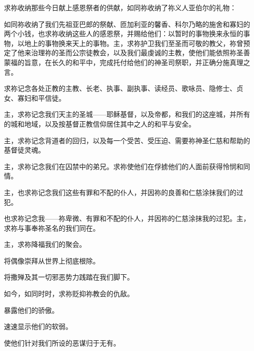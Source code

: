 求祢收纳那些今日献上感恩祭者的供献，如同祢收纳了祢义人亚伯尔的礼物：\par

\par

如同祢收纳了我们先祖亚巴郎的祭献、匝加利亚的馨香、科尔乃略的施舍和寡妇的两个小钱，也求祢收纳这些人的感恩祭，并赐给他们：以暂时的事物换来永恒的事物，以地上的事物换来天上的事物。主，求祢护卫我们至圣而可敬的教父，祢曾预定了他来治理祢的圣而公宗徒教会，以及我们最虔诚的主教，使他们能依照祢圣善蒙福的旨意，在长久的和平中，完成托付给他们的神圣司祭职，并正确分施真理之言。\par

求祢记念各处正教的主教、长老、执事、副执事、读经员、歌咏员、隐修士、贞女、寡妇和平信徒。\par

主，求祢记念我们天主的圣城——耶稣基督，以及帝都，和我们的这座城，并所有的城和地域，以及按基督正教信仰居住其中之人的和平与安全。\par

主，求祢记念背道者的回归，以及每一个受苦、受压迫、需要祢神圣仁慈和帮助的基督徒灵魂。\par

主，求祢记念我们在囚禁中的弟兄。求祢使他们在俘掳他们的人面前获得怜悯和同情。\par

主，也求祢记念我们这些有罪和不配的仆人，并因祢的良善和仁慈涂抹我们的过犯。\par

也求祢记念我——祢卑微、有罪和不配的仆人，并因祢的仁慈涂抹我的过犯。主，求祢与事奉祢圣名的我们同在。\par

主，求祢降福我们的聚会。\par

将偶像崇拜从世界上彻底根除。\par

将撒殚及其一切邪恶势力践踏在我们脚下。\par

如今，如同时时，求祢贬抑祢教会的仇敌。\par

暴露他们的骄傲。\par

速速显示他们的软弱。\par

使他们针对我们所设的恶谋归于无有。\par

